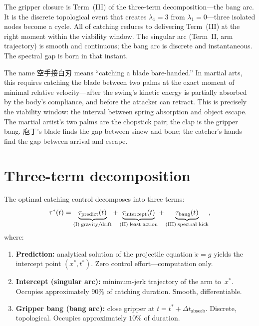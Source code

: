 \begin{remark}
The gripper closure is Term~(III) of the three-term
decomposition---the bang arc.  It is the discrete topological
event that creates $\lambda_1 = 3$ from $\lambda_1 = 0$---three isolated nodes become a cycle.
All of catching reduces to delivering Term~(III) at the right
moment within the viability window.  The singular arc
(Term~II, arm trajectory) is smooth and continuous; the bang
arc is discrete and instantaneous.  The spectral gap is born
in that instant.
\end{remark}

\begin{remark}[空手接白刃]
The name 空手接白刃 means ``catching a blade bare-handed.''
In martial arts, this requires catching the blade between two
palms at the exact moment of minimal relative velocity---after
the swing's kinetic energy is partially absorbed by the body's
compliance, and before the attacker can retract.  This is
precisely the viability window: the interval between spring
absorption and object escape.  The martial artist's two palms
are the chopstick pair; the clap is the gripper bang.
庖丁's blade finds the gap between sinew and bone; the
catcher's hands find the gap between arrival and escape.
\end{remark}


\section{Three-term decomposition}
\label{sec:c-three-term}

\begin{theorem}
\label{thm:c-decomp}
The optimal catching control decomposes into three terms:
\[
  \tau^*(t)
  = \underbrace{\tau_{\mathrm{predict}}(t)}_{\text{(I)\;gravity/drift}}
  + \underbrace{\tau_{\mathrm{intercept}}(t)}_{\text{(II)\;least action}}
  + \underbrace{\tau_{\mathrm{bang}}(t)}_{\text{(III)\;spectral kick}},
\]
where:
\begin{enumerate}[label=(\Roman*),nosep]
  \item \textbf{Prediction:} analytical solution of the projectile
  equation $\ddot{x} = g$ yields the intercept point $(x^*, t^*)$.
  Zero control effort---computation only.
  \item \textbf{Intercept (singular arc):} minimum-jerk trajectory
  of the arm to~$x^*$.  Occupies approximately $90\%$ of catching
  duration.  Smooth, differentiable.
  \item \textbf{Gripper bang (bang arc):} close gripper at
  $t = t^* + \Delta t_{\mathrm{absorb}}$.  Discrete, topological.
  Occupies approximately $10\%$ of duration.
\end{enumerate}
\end{theorem}

